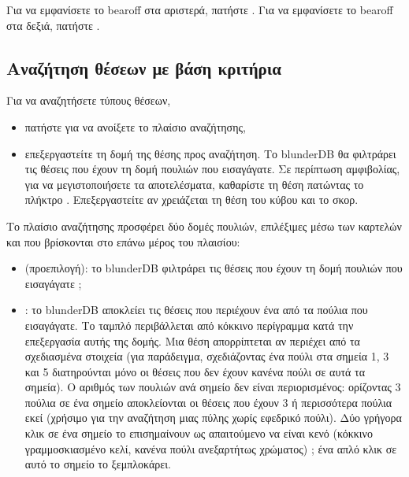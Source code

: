 \documentclass[letterpaper,10pt,greek]{sphinxmanual}
\begin{document}
\sphinxAtStartPar
Για να εμφανίσετε το bearoff στα αριστερά, πατήστε . Για να εμφανίσετε το bearoff στα δεξιά, πατήστε .


\subsection{Αναζήτηση θέσεων με βάση κριτήρια}
\label{\detokenize{guide_utilisateur:rechercher-des-positions-selon-des-criteres}}
\sphinxAtStartPar
Για να αναζητήσετε τύπους θέσεων,
\begin{itemize}
\item {} 
\sphinxAtStartPar
πατήστε  για να ανοίξετε το πλαίσιο αναζήτησης,

\item {} 
\sphinxAtStartPar
επεξεργαστείτε τη δομή της θέσης προς αναζήτηση. Το blunderDB θα φιλτράρει τις θέσεις που έχουν  τη δομή πουλιών που εισαγάγατε. Σε περίπτωση αμφιβολίας, για να μεγιστοποιήσετε τα αποτελέσματα, καθαρίστε τη θέση πατώντας το πλήκτρο . Επεξεργαστείτε αν χρειάζεται τη θέση του κύβου και το σκορ.

\end{itemize}

\sphinxAtStartPar
Το πλαίσιο αναζήτησης προσφέρει δύο δομές πουλιών, επιλέξιμες μέσω των καρτελών  και  που βρίσκονται στο επάνω μέρος του πλαισίου:
\begin{itemize}
\item {} 
\sphinxAtStartPar
{} (προεπιλογή): το blunderDB φιλτράρει τις θέσεις που έχουν  τη δομή πουλιών που εισαγάγατε ;

\item {} 
\sphinxAtStartPar
{}: το blunderDB αποκλείει τις θέσεις που περιέχουν ένα από τα πούλια που εισαγάγατε. Το ταμπλό περιβάλλεται από κόκκινο περίγραμμα κατά την επεξεργασία αυτής της δομής. Μια θέση απορρίπτεται αν περιέχει  από τα σχεδιασμένα στοιχεία (για παράδειγμα, σχεδιάζοντας ένα πούλι στα σημεία 1, 3 και 5 διατηρούνται μόνο οι θέσεις που δεν έχουν κανένα πούλι σε αυτά τα σημεία). Ο αριθμός των πουλιών ανά σημείο δεν είναι περιορισμένος: ορίζοντας 3 πούλια σε ένα σημείο αποκλείονται οι θέσεις που έχουν 3 ή περισσότερα πούλια εκεί (χρήσιμο για την αναζήτηση μιας πύλης χωρίς εφεδρικό πούλι). Δύο γρήγορα κλικ σε ένα σημείο το επισημαίνουν ως απαιτούμενο να είναι κενό (κόκκινο γραμμοσκιασμένο κελί, κανένα πούλι ανεξαρτήτως χρώματος) ; ένα απλό κλικ σε αυτό το σημείο το ξεμπλοκάρει.

\end{itemize}
\end{document}
